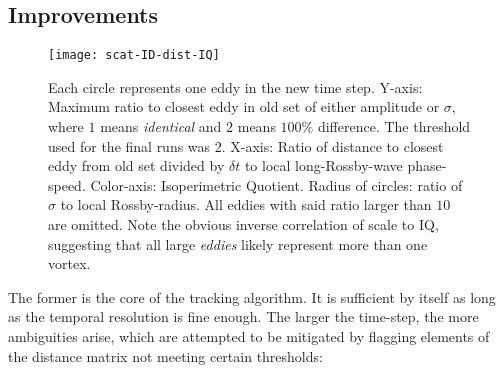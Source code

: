 \subsection*{Improvements}
 \begin{wrapfigure}{r}{0.4\textwidth}
	\texttt{[image: scat-ID-dist-IQ]}
	\caption{Each circle represents one eddy in the new time step. Y-axis: Maximum ratio to closest eddy in old set of either amplitude or $\sigma$, where $1$ means \textit{identical} and $2$ means $100\%$ difference. The threshold used for the final runs was $2$. X-axis: Ratio of distance to closest eddy from old set divided by $\delta t$ to local long-Rossby-wave phase-speed. Color-axis: Isoperimetric Quotient. Radius of circles: ratio of $\sigma$ to local Rossby-radius. All eddies with said ratio larger than $10$ are omitted. Note the obvious inverse correlation of scale to IQ, suggesting that all large \textit{eddies} likely represent more than one vortex. }
	\label{fig:scat-ID-dist-IQ}
\end{wrapfigure}
The former is the core of the tracking algorithm. It is sufficient by itself as long as the temporal resolution is fine enough. The larger the time-step, the more ambiguities arise, which are attempted to be mitigated by flagging elements of the distance matrix not meeting certain thresholds:


